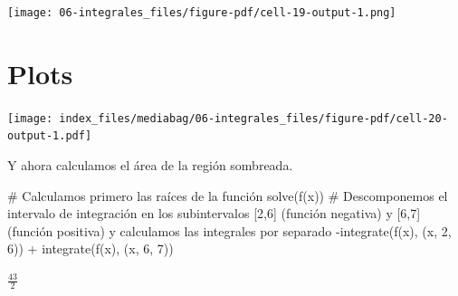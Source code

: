 \documentclass[
  a4paper,
]{scrreport}
\newenvironment{Shaded}{\begin{snugshade}}{\end{snugshade}}
\newcommand{\BuiltInTok}[1]{\textcolor[rgb]{0.00,0.23,0.31}{#1}}
\newcommand{\CommentTok}[1]{\textcolor[rgb]{0.37,0.37,0.37}{#1}}
\newcommand{\DataTypeTok}[1]{\textcolor[rgb]{0.68,0.00,0.00}{#1}}
\newcommand{\FloatTok}[1]{\textcolor[rgb]{0.68,0.00,0.00}{#1}}
\newcommand{\FunctionTok}[1]{\textcolor[rgb]{0.28,0.35,0.67}{#1}}
\newcommand{\ImportTok}[1]{\textcolor[rgb]{0.00,0.46,0.62}{#1}}
\newcommand{\NormalTok}[1]{\textcolor[rgb]{0.00,0.23,0.31}{#1}}
\newcommand{\OperatorTok}[1]{\textcolor[rgb]{0.37,0.37,0.37}{#1}}
\newcommand{\PreprocessorTok}[1]{\textcolor[rgb]{0.68,0.00,0.00}{#1}}
\newcommand{\SpecialCharTok}[1]{\textcolor[rgb]{0.37,0.37,0.37}{#1}}
\newcommand{\StringTok}[1]{\textcolor[rgb]{0.13,0.47,0.30}{#1}}
\theoremstyle{definition}
\theoremstyle{remark}
\begin{document}
\begin{tcolorbox}
\texttt{[image: 06-integrales\_files/figure-pdf/cell-19-output-1.png]}

\section{Plots}

\begin{Shaded}
\end{Shaded}

\texttt{[image: index\_files/mediabag/06-integrales\_files/figure-pdf/cell-20-output-1.pdf]}

Y ahora calculamos el área de la región sombreada.

\begin{Shaded}
\begin{Highlighting}[]
\CommentTok{\# Calculamos primero las raíces de la función}
\FunctionTok{solve}\NormalTok{(}\FunctionTok{f}\NormalTok{(x))}
\CommentTok{\# Descomponemos el intervalo de integración en los subintervalos [2,6] (función negativa) y [6,7] (función positiva) y calculamos las integrales por separado}
\FunctionTok{{-}integrate}\NormalTok{(}\FunctionTok{f}\NormalTok{(x), (x, }\FloatTok{2}\NormalTok{, }\FloatTok{6}\NormalTok{)) }\OperatorTok{+} \FunctionTok{integrate}\NormalTok{(}\FunctionTok{f}\NormalTok{(x), (x, }\FloatTok{6}\NormalTok{, }\FloatTok{7}\NormalTok{))}
\end{Highlighting}
\end{Shaded}

$\frac{43}{2}$

\end{tcolorbox}
\end{document}
